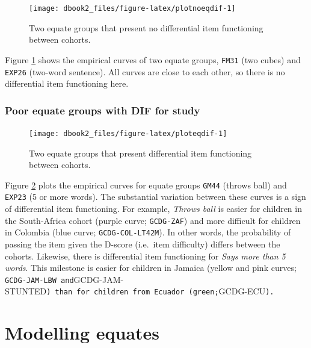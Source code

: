 \documentclass[
]{book}
\begin{document}
\begin{figure}

{\centering \texttt{[image: dbook2\_files/figure-latex/plotnoeqdif-1]} 

}

\caption{Two equate groups that present no differential item functioning between cohorts.}\label{fig:plotnoeqdif}
\end{figure}



Figure \ref{fig:plotnoeqdif} shows the empirical curves of two equate groups, \texttt{FM31} (two cubes) and \texttt{EXP26} (two-word sentence). All curves are close to each other, so there is no differential item functioning here.

\hypertarget{poor-equate-groups-with-dif-for-study}{%
\subsection{Poor equate groups with DIF for study}\label{poor-equate-groups-with-dif-for-study}}

\begin{figure}

{\centering \texttt{[image: dbook2\_files/figure-latex/ploteqdif-1]} 

}

\caption{Two equate groups that present differential item functioning between cohorts.}\label{fig:ploteqdif}
\end{figure}



Figure \ref{fig:ploteqdif} plots the empirical curves for equate groups \texttt{GM44} (throws ball) and \texttt{EXP23} (5 or more words). The substantial variation between these curves is a sign of differential item functioning. For example, \emph{Throws ball} is easier for children in the South-Africa cohort (purple curve; \texttt{GCDG-ZAF}) and more difficult for children in Colombia (blue curve; \texttt{GCDG-COL-LT42M}). In other words, the probability of passing the item given the D-score (i.e.~item difficulty) differs between the cohorts. Likewise, there is differential item functioning for \emph{Says more than 5 words}. This milestone is easier for children in Jamaica (yellow and pink curves; \texttt{GCDG-JAM-LBW\ and}GCDG-JAM-STUNTED\texttt{)\ than\ for\ children\ from\ Ecuador\ (green;}GCDG-ECU\texttt{).}

\newpage

\hypertarget{ch:modellingequates}{%
\chapter{Modelling equates}\label{ch:modellingequates}}
\end{document}
